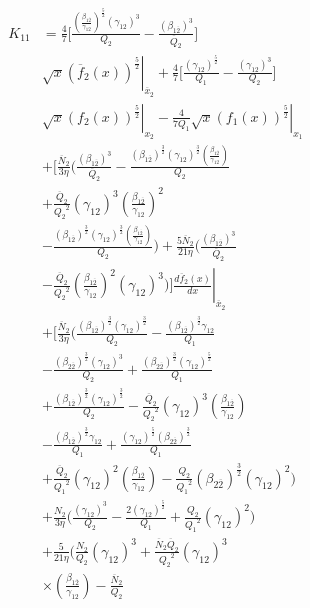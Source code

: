 \documentclass[preprint,12pt]{elsarticle}
\begin{document}
            \begin{equation*}
               \begin{split}
              K_{11} & = \frac{4}{7} \biggl[ \frac{ \left(\frac{\beta_{1\overline{2}}}{\gamma_{12}}\right)^\frac{5}{2} (\gamma_{12})^3}{Q_2} -  \frac{(\beta_{1\overline{2}})^3}{\overline{Q}_{2}} \biggr] \\ & \sqrt{x} \left. (\overline{f}_{2}(x))^\frac{5}{2} \right|_{\overline{x}_{2}}  +  \frac{4}{7} \biggl[\frac{(\gamma_{12})^\frac{5}{2}}{Q_1} - \frac{(\gamma_{12})^3}{Q_2} \biggr] \\ & \left. \sqrt{x} (f_2(x))^\frac{5}{2} \right|_{x_2}   -\left. \frac{4}{7 Q_1} \sqrt{x} (f_1(x))^\frac{5}{2} \right|_{x_1}  \\ & + \Biggl[ \frac{\overline{N}_{2}}{3 \eta} \Biggl( \frac{(\beta_{1\overline{2}})^3}{\overline{Q}_{2}}  - \frac{(\beta_{1\overline{2}})^\frac{3}{2} (\gamma_{12})^\frac{3}{2}  \left(\frac{\beta_{1\overline{2}}}{\gamma_{12}}\right)}{Q_2}  \\ & + \frac{\overline{Q}_{2}}{{Q_2}^2} (\gamma_{12})^3  \left(\frac{\beta_{1\overline{2}}}{\gamma_{12}}\right)^2 \\ & - \frac{(\beta_{1\overline{2}})^\frac{3}{2} (\gamma_{12})^\frac{3}{2}  \left(\frac{\beta_{1\overline{2}}}{\gamma_{12}}\right)}{Q_2} \Biggr) + \frac{5 \overline{N}_{2}}{21 \eta} \Biggl( \frac{(\beta_{1\overline{2}})^3}{\overline{Q}_{2}}  \\ &  - \left. \frac{\overline{Q}_{2}}{{Q_2}^2}  \left(\frac{\beta_{1\overline{2}}}{\gamma_{12}}\right)^2 (\gamma_{12})^3 \Biggr) \Biggr] \frac{d\overline{f}_{2}(x)}{dx} \right|_{\overline{x}_{2}}  \\ & + \Biggl[ \frac{\overline{N}_{2}}{3 \eta}  \Biggl( \frac{(\beta_{1\overline{2}})^\frac{3}{2} (\gamma_{12})^\frac{3}{2}}{Q_2}  - \frac{(\beta_{1\overline{2}})^\frac{3}{2} \gamma_{12}}{Q_1} \\ & - \frac{(\beta_{2\overline{2}})^\frac{3}{2}(\gamma_{12})^3}{Q_2} + \frac{(\beta_{2\overline{2}})^\frac{3}{2} (\gamma_{12})^\frac{5}{2}}{Q_1}  \\ & + \frac{(\beta_{1\overline{2}})^\frac{3}{2} (\gamma_{12})^\frac{3}{2}}{Q_2}  - \frac{\overline{Q}_{2}}{{Q_2}^2} (\gamma_{12})^3  \left(\frac{\beta_{1\overline{2}}}{\gamma_{12}}\right) \\ &- \frac{(\beta_{1\overline{2}})^\frac{3}{2} \gamma_{12}}{Q_1}  + \frac{(\gamma_{12})^\frac{5}{2} (\beta_{2\overline{2}})^\frac{3}{2}}{Q_1} \\ & + \frac{\overline{Q}_{2}}{{Q_1}^2} (\gamma_{12})^2  \left(\frac{\beta_{1\overline{2}}}{\gamma_{12}}\right)  - \frac{Q_2}{{Q_1}^2} (\beta_{2\overline{2}})^\frac{3}{2} (\gamma_{12})^2 \Biggr)  \\ & + \frac{N_2}{3 \eta} \Biggl( \frac{(\gamma_{12})^3}{Q_2}  - \frac{2(\gamma_{12})^\frac{5}{2}}{Q_1} + \frac{Q_2}{{Q_1}^2} (\gamma_{12})^2 \Biggr)  \\ & + \frac{5}{21 \eta} \Biggl(\frac{N_2}{Q_2} (\gamma_{12})^3 + \frac{\overline{N}_{2} \overline{Q}_{2}}{{Q_2}^2}(\gamma_{12})^3 \\ & \times \left(\frac{\beta_{1\overline{2}}}{\gamma_{12}}\right)  - \frac{\overline{N}_{2}}{Q_2} 
\end{split}
\end{equation*}
\end{document}
